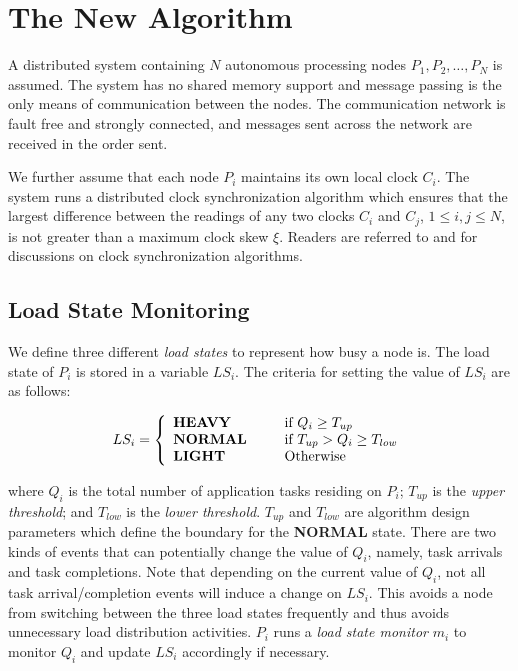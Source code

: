 \section{The New Algorithm}
\label{sec:anti.basic.algorithm}

A distributed system containing 
$N$ autonomous processing nodes $P_1, P_2, \ldots, P_N$ is assumed.
The system has no shared memory support and message passing
is the only means of communication between the nodes.
The communication network is fault free and strongly connected, and
messages sent across the network are received in the order sent.

We further assume that
each node $P_i$ maintains its own local clock $C_i$.
The system runs a distributed clock synchronization algorithm
which ensures that the largest difference between the
readings of any two clocks $C_i$ and $C_j$, $1 \leq i, j \leq N$,
is not greater than a maximum clock skew $\xi$.
Readers are referred to \cite{levi90} and \cite{tanenbaum95}
for discussions on clock synchronization algorithms.




\subsection {Load State Monitoring}
\label{sec:anti.basic.monitor}

We define three different {\it load states\/} 
to represent how busy a node is.
The load state of $P_i$ is stored in a variable $LS_i$.
The criteria for setting the value of $LS_i$ are as follows:

\begin{equation}
	LS_i = \left\{ 
	\begin{array}{ll}
	{\bf HEAVY} \hspace{1cm} & \mbox{if } Q_i \geq T_{up} \\
	{\bf NORMAL}		 & \mbox{if } T_{up} > Q_i \geq T_{low} \\
	{\bf LIGHT}		 & \mbox{Otherwise}
	\end{array}
	\right.
\label{eqn:anti.basic.load_state}
\end{equation}

\noindent
where $Q_i$ is the total number of application tasks residing on $P_i$;
$T_{up}$ is the {\it upper threshold\/}; and 
$T_{low}$ is the {\it lower threshold\/}.
$T_{up}$ and $T_{low}$ are algorithm design parameters
which define the boundary for the {\bf NORMAL} state.
%
There are two kinds of events that can potentially change the value of $Q_i$,
namely, task arrivals and task completions.
Note that depending on the current value of $Q_i$,
not all task arrival/completion events will induce a change on $LS_i$.
This avoids a node from switching between 
the three load states frequently and thus avoids
unnecessary load distribution activities.
%
$P_i$ runs a {\it load state monitor\/} $m_i$
to monitor $Q_i$ and update $LS_i$ accordingly if necessary.

